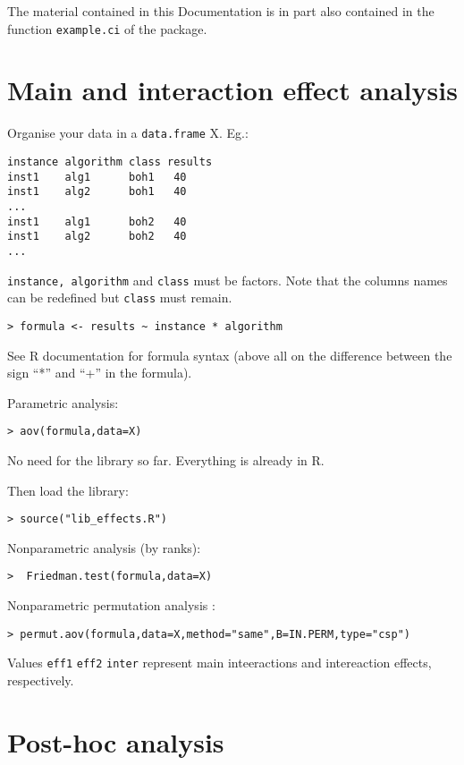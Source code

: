 \documentclass[a4paper,11pt]{article}
\begin{document}
 The material contained in this Documentation
is in part also contained in the function \texttt{example.ci} of the
package.

\section{Main and interaction effect analysis}


Organise your data in a \texttt{data.frame} X. Eg.:

\begin{verbatim}
instance algorithm class results
inst1    alg1      boh1   40
inst1    alg2      boh1   40
...
inst1    alg1      boh2   40
inst1    alg2      boh2   40
...
\end{verbatim}

\texttt{instance, algorithm} and \texttt{class} must be factors. Note
that the columns names can be redefined but \texttt{class} must remain.

\begin{verbatim}
> formula <- results ~ instance * algorithm
\end{verbatim}

See R documentation for formula syntax (above all on the difference
between the sign ``*'' and ``+'' in the formula).

\bigskip
Parametric analysis:
\begin{verbatim}
> aov(formula,data=X)
\end{verbatim}

No need for the library so far. Everything is already in R.

\medskip

Then load the library:

\begin{verbatim}
> source("lib_effects.R")
\end{verbatim}

 
Nonparametric analysis (by ranks):
\begin{verbatim}
>  Friedman.test(formula,data=X)
\end{verbatim}

Nonparametric permutation analysis :
\begin{verbatim}
> permut.aov(formula,data=X,method="same",B=IN.PERM,type="csp")    
\end{verbatim}

Values \texttt{eff1} \texttt{eff2} \texttt{inter} represent main inteeractions and
intereaction effects, respectively.

\section{Post-hoc analysis}
\end{document}
